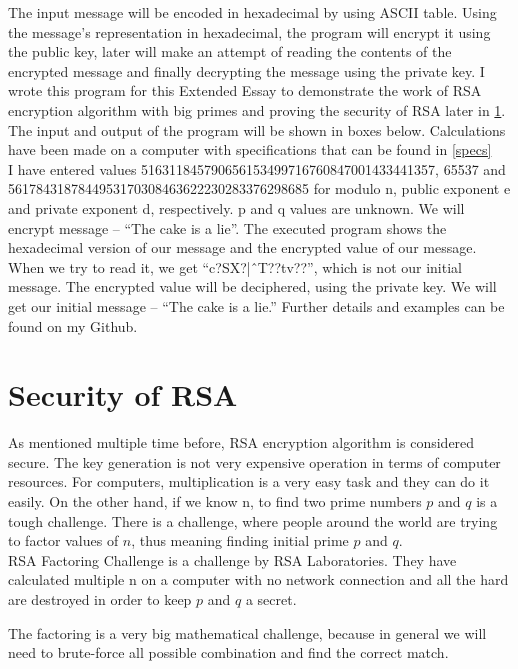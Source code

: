 \documentclass[a4paper, 12pt]{article}
\begin{document}
The input message will be encoded in hexadecimal by using ASCII table. Using
the message’s representation in hexadecimal, the program will encrypt it using the public key, later
will make an attempt of reading the contents of the encrypted message and finally decrypting the
message using the private key. I wrote this program for this Extended Essay to demonstrate the
work of RSA encryption algorithm with big primes and proving the security of RSA later in \ref{sec:security}.
The input and output of the program will be shown in boxes below. Calculations have been
made on a computer with specifications that can be found in \ref{specs}\\

I have entered values 516311845790656153499716760847001433441357, 65537 and
5617843187844953170308463622230283376298685 for modulo n, public exponent e and private
exponent d, respectively. p and q values are unknown. We will encrypt message – “The cake is a
lie”. The executed program shows the hexadecimal version of our message and the encrypted
value of our message. When we try to read it, we get “c?SX?|ˆT??tv??”, which is not our
initial message. The encrypted value will be deciphered, using the private key. We will get our
initial message – “The cake is a lie.” Further details and examples can be found on my Github\cite{github}.\\

\section{Security of RSA}
\label{sec:security}

As mentioned multiple time before, RSA encryption algorithm is considered secure. The key
generation is not very expensive operation in terms of computer resources. For computers,
multiplication is a very easy task and they can do it easily. On the other hand, if we know n, to
find two prime numbers $p$ and $q$ is a tough challenge. There is a challenge, where people around
the world are trying to factor values of $n$, thus meaning finding initial prime $p$ and $q$.\cite{rsa}\\

RSA Factoring Challenge is a challenge by RSA Laboratories. They have calculated multiple n on
a computer with no network connection and all the hard are destroyed in order to keep $p$ and $q$ a
secret.

The factoring is a very big mathematical challenge, because in general we will need to brute-force
all possible combination and find the correct match.
\end{document}
